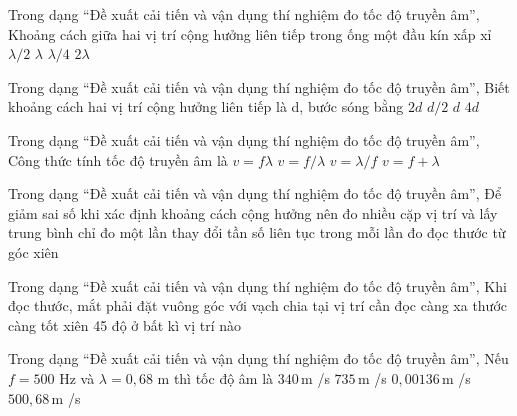 \begin{ex}
Trong dạng “Đề xuất cải tiến và vận dụng thí nghiệm đo tốc độ truyền âm”, Khoảng cách giữa hai vị trí cộng hưởng liên tiếp trong ống một đầu kín xấp xỉ
\choice
{\True $\lambda/2$}
{$\lambda$}
{$\lambda/4$}
{$2\lambda$}
\end{ex}

\begin{ex}
Trong dạng “Đề xuất cải tiến và vận dụng thí nghiệm đo tốc độ truyền âm”, Biết khoảng cách hai vị trí cộng hưởng liên tiếp là d, bước sóng bằng
\choice
{\True $2d$}
{$d/2$}
{$d$}
{$4d$}
\end{ex}

\begin{ex}
Trong dạng “Đề xuất cải tiến và vận dụng thí nghiệm đo tốc độ truyền âm”, Công thức tính tốc độ truyền âm là
\choice
{\True $v=f\lambda$}
{$v=f/\lambda$}
{$v=\lambda/f$}
{$v=f+\lambda$}
\end{ex}

\begin{ex}
Trong dạng “Đề xuất cải tiến và vận dụng thí nghiệm đo tốc độ truyền âm”, Để giảm sai số khi xác định khoảng cách cộng hưởng nên
\choice
{\True đo nhiều cặp vị trí và lấy trung bình}
{chỉ đo một lần}
{thay đổi tần số liên tục trong mỗi lần đo}
{đọc thước từ góc xiên}
\end{ex}

\begin{ex}
Trong dạng “Đề xuất cải tiến và vận dụng thí nghiệm đo tốc độ truyền âm”, Khi đọc thước, mắt phải đặt
\choice
{\True vuông góc với vạch chia tại vị trí cần đọc}
{càng xa thước càng tốt}
{xiên 45 độ}
{ở bất kì vị trí nào}
\end{ex}

\begin{ex}
Trong dạng “Đề xuất cải tiến và vận dụng thí nghiệm đo tốc độ truyền âm”, Nếu $f=500$ Hz và $\lambda=0,68$ m thì tốc độ âm là
\choice
{\True $340\,\text{m}$ /s}
{$735\,\text{m}$ /s}
{$0,00136\,\text{m}$ /s}
{$500,68\,\text{m}$ /s}
\end{ex}

